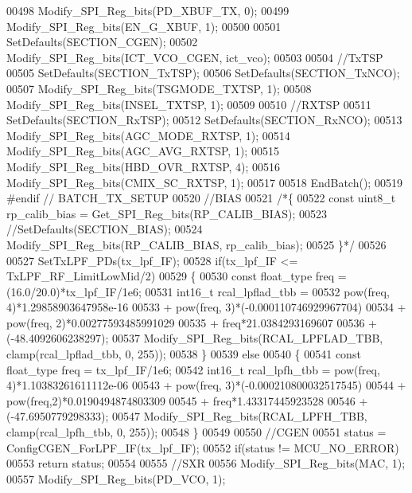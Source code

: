 \begin{DoxyCode}
00498     Modify_SPI_Reg_bits(PD_XBUF_TX, 0);
00499     Modify_SPI_Reg_bits(EN_G_XBUF, 1);
00500 
00501     SetDefaults(SECTION_CGEN);
00502     Modify_SPI_Reg_bits(ICT_VCO_CGEN, ict\_vco);
00503 
00504     \textcolor{comment}{//TxTSP}
00505     SetDefaults(SECTION_TxTSP);
00506     SetDefaults(SECTION_TxNCO);
00507     Modify_SPI_Reg_bits(TSGMODE_TXTSP, 1);
00508     Modify_SPI_Reg_bits(INSEL_TXTSP, 1);
00509 
00510     \textcolor{comment}{//RXTSP}
00511     SetDefaults(SECTION_RxTSP);
00512     SetDefaults(SECTION_RxNCO);
00513     Modify_SPI_Reg_bits(AGC_MODE_RXTSP, 1);
00514     Modify_SPI_Reg_bits(AGC_AVG_RXTSP, 1);
00515     Modify_SPI_Reg_bits(HBD_OVR_RXTSP, 4);
00516     Modify_SPI_Reg_bits(CMIX_SC_RXTSP, 1);
00517 
00518     EndBatch();
00519 \textcolor{preprocessor}{#endif // BATCH\_TX\_SETUP}
00520     \textcolor{comment}{//BIAS}
00521     \textcolor{comment}{/*\{}
00522 \textcolor{comment}{    const uint8\_t rp\_calib\_bias = Get\_SPI\_Reg\_bits(RP\_CALIB\_BIAS);}
00523 \textcolor{comment}{    //SetDefaults(SECTION\_BIAS);}
00524 \textcolor{comment}{    Modify\_SPI\_Reg\_bits(RP\_CALIB\_BIAS, rp\_calib\_bias);}
00525 \textcolor{comment}{    \}*/}
00526 
00527     SetTxLPF_PDs(tx\_lpf\_IF);
00528     \textcolor{keywordflow}{if}(tx\_lpf\_IF <= TxLPF_RF_LimitLowMid/2)
00529     \{
00530         \textcolor{keyword}{const} float_type freq = (16.0/20.0)*tx\_lpf\_IF/1e6;
00531         int16\_t rcal\_lpflad\_tbb =
00532               pow(freq, 4)*1.29858903647958e-16
00533             + pow(freq, 3)*(-0.000110746929967704)
00534             + pow(freq, 2)*0.00277593485991029
00535             + freq*21.0384293169607
00536             + (-48.4092606238297);
00537         Modify_SPI_Reg_bits(RCAL_LPFLAD_TBB, clamp(rcal\_lpflad\_tbb, 0, 255));
00538     \}
00539     \textcolor{keywordflow}{else}
00540     \{
00541         \textcolor{keyword}{const} float_type freq = tx\_lpf\_IF/1e6;
00542         int16\_t rcal\_lpfh\_tbb = pow(freq, 4)*1.10383261611112e-06
00543             + pow(freq, 3)*(-0.000210800032517545)
00544             + pow(freq,2)*0.0190494874803309
00545             + freq*1.43317445923528
00546             + (-47.6950779298333);
00547         Modify_SPI_Reg_bits(RCAL_LPFH_TBB, clamp(rcal\_lpfh\_tbb, 0, 255));
00548     \}
00549 
00550     \textcolor{comment}{//CGEN}
00551     status = ConfigCGEN_ForLPF_IF(tx\_lpf\_IF);
00552     \textcolor{keywordflow}{if}(status != MCU_NO_ERROR)
00553         \textcolor{keywordflow}{return} status;
00554 
00555     \textcolor{comment}{//SXR}
00556     Modify_SPI_Reg_bits(MAC, 1);
00557     Modify_SPI_Reg_bits(PD_VCO, 1);

\end{DoxyCode}
